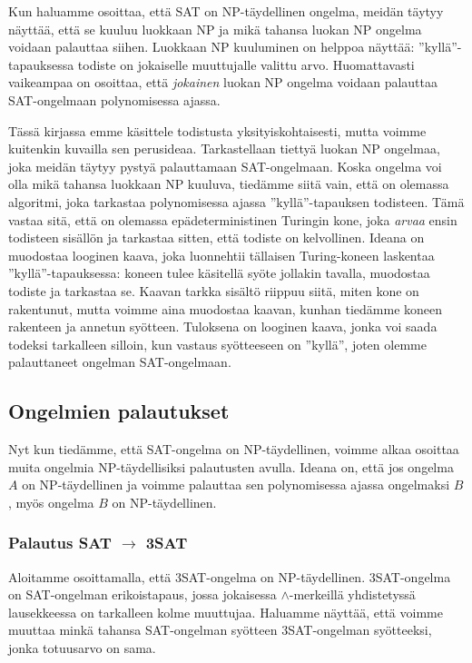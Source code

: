 Kun haluamme osoittaa, että SAT on NP-täydellinen ongelma,
meidän täytyy näyttää, että se kuuluu luokkaan NP ja mikä
tahansa luokan NP ongelma voidaan palauttaa siihen.
Luokkaan NP kuuluminen on helppoa näyttää:
''kyllä''-tapauksessa todiste on jokaiselle muuttujalle valittu arvo.
Huomattavasti vaikeampaa on osoittaa, että \emph{jokainen} luokan
NP ongelma voidaan palauttaa SAT-ongelmaan polynomisessa ajassa.

Tässä kirjassa emme käsittele todistusta yksityiskohtaisesti,
mutta voimme kuitenkin kuvailla sen perusideaa.
Tarkastellaan tiettyä luokan NP ongelmaa,
joka meidän täytyy pystyä palauttamaan SAT-ongelmaan.
Koska ongelma voi olla mikä tahansa luokkaan NP kuuluva, tiedämme siitä vain,
että on olemassa algoritmi, joka tarkastaa
polynomisessa ajassa ''kyllä''-tapauksen todisteen.
Tämä vastaa sitä, että on olemassa epädeterministinen
Turingin kone, joka \emph{arvaa} ensin todisteen sisällön ja
tarkastaa sitten, että todiste on kelvollinen.
Ideana on muodostaa looginen kaava, joka luonnehtii tällaisen
Turing-koneen laskentaa ''kyllä''-tapauksessa:
koneen tulee käsitellä syöte jollakin tavalla,
muodostaa todiste ja tarkastaa se.
Kaavan tarkka sisältö riippuu siitä, miten kone on rakentunut,
mutta voimme aina muodostaa kaavan, kunhan tiedämme koneen rakenteen
ja annetun syötteen.
Tuloksena on looginen kaava, jonka voi saada todeksi tarkalleen silloin,
kun vastaus syötteeseen on ''kyllä'',
joten olemme palauttaneet ongelman SAT-ongelmaan.

\subsection{Ongelmien palautukset}

Nyt kun tiedämme, että SAT-ongelma on NP-täydellinen,
voimme alkaa osoittaa muita ongelmia NP-täydellisiksi palautusten avulla.
Ideana on, että jos ongelma $A$ on NP-täydellinen ja
voimme palauttaa sen polynomisessa ajassa ongelmaksi $B$,
myös ongelma $B$ on NP-täydellinen.

\subsubsection{Palautus SAT $\rightarrow$ 3SAT}

Aloitamme osoittamalla, että 3SAT-ongelma on NP-täydellinen.
3SAT-on\-gelma on SAT-ongelman erikoistapaus, jossa jokaisessa
$\land$-merkeillä yhdistetyssä lausekkeessa on tarkalleen kolme muuttujaa.
Haluamme näyttää, että voimme muuttaa minkä tahansa
SAT-ongelman syötteen 3SAT-ongelman syötteeksi,
jonka totuusarvo on sama.

